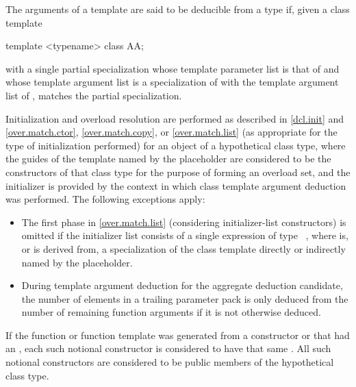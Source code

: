 %
\pnum
The arguments of a template  are said to be
deducible from a type  if, given a class template
\begin{codeblock}
template <typename> class AA;
\end{codeblock}
with a single partial specialization
whose template parameter list is that of  and
whose template argument list is a specialization of 
with the template argument list of ,
 matches the partial specialization.

\pnum
Initialization and overload resolution are performed as described
in \ref{dcl.init} and \ref{over.match.ctor}, \ref{over.match.copy},
or \ref{over.match.list} (as appropriate for the type of initialization
performed) for an object of a hypothetical class type, where
the guides of the template named by the placeholder are considered to be the
constructors of that class type for the purpose of forming an overload
set, and the initializer is provided by the context in which class
template argument deduction was performed.
The following exceptions apply:
\begin{itemize}
\item
The first phase in \ref{over.match.list}
(considering initializer-list constructors)
is omitted if the initializer list consists of
a single expression of type \cv{}~,
where  is, or is derived from,
a specialization of the class template
directly or indirectly named by the placeholder.
\item
During template argument deduction for the aggregate deduction candidate,
the number of elements in a trailing parameter pack
is only deduced from the number of remaining function arguments
if it is not otherwise deduced.
\end{itemize}
If the function or function template was generated from
a constructor or 
that had an ,
each such notional constructor is considered to have
that same .
All such notional constructors are considered to be
public members of the hypothetical class type.

